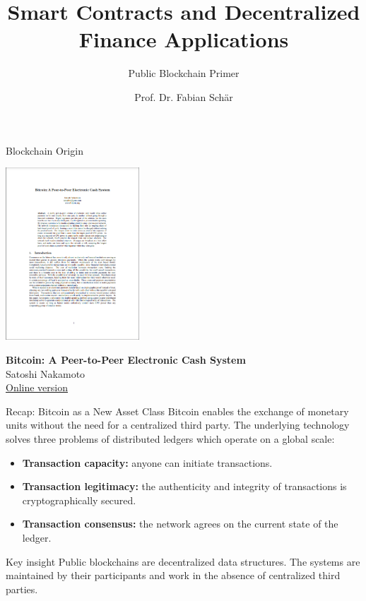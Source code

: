 \documentclass[]{beamer}
\title{Smart Contracts and Decentralized Finance Applications}
\subtitle{Public Blockchain Primer}
\author{Prof. Dr. Fabian Schär}
\institute{University of Basel}
\begin{document}
\thispagestyle{empty}
\begin{frame}[noframenumbering]
	\titlepage
\end{frame}

\begin{frame}{Blockchain Origin}

\centering
\includegraphics[width = 5cm, frame]{../assets/images/nakamoto_cover}
		
\textbf{Bitcoin: A Peer-to-Peer Electronic Cash System} \\ 
Satoshi Nakamoto \\
\href{https://bitcoin.org/bitcoin.pdf}{\link Online version}

\end{frame}

\begin{frame}{Recap: Bitcoin as a New Asset Class}
Bitcoin enables the exchange of monetary units \textcolor{focus}{without the need for a centralized third party}. The underlying technology solves three problems of distributed ledgers which operate on a global scale:

\begin{itemize}
\item \textbf{Transaction capacity:} anyone can initiate transactions.
\item \textbf{Transaction legitimacy:} the authenticity and integrity of transactions is cryptographically secured.
\item \textbf{Transaction consensus:} the network agrees on the current state of the ledger.

\end{itemize}

\begin{alertblock}{Key insight}
Public blockchains are decentralized data structures. The systems are maintained by their participants and work in the absence of centralized third parties.
\end{alertblock}
\end{frame}
\end{document}
